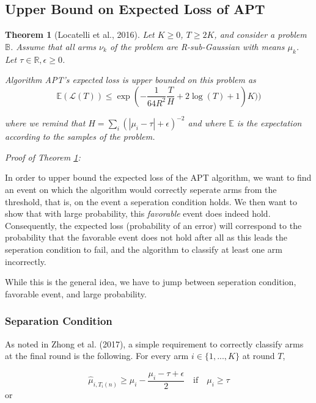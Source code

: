 \documentclass[12pt,]{article}
\newtheorem{theorem}{Theorem}
\begin{document}
\subsection{Upper Bound on Expected Loss of
APT}\label{upper-bound-on-expected-loss-of-apt}

\begin{theorem}[Locatelli et al., 2016] \label{theorem:LocatelliTheorem4}
Let $K \geq 0$, $T \geq 2K$, and consider a problem $\mathbb{B}$. Assume that
all arms $\nu_k$ of the problem are R-sub-Gaussian with means $\mu_k$. Let $\tau
\in \mathbb{R}, \epsilon \geq 0$.

Algorithm APT's expected loss is upper bounded on this problem as 
\begin{equation*} \mathbb{E}(\mathcal{L}(T)) \leq \exp
(-\frac{1}{64R^2}\frac{T}{H} + 2 \log (T) + 1)K)) \end{equation*}

where we remind that $H = \sum_i (|\mu_i - \tau | + \epsilon)^{-2}$ and where
$\mathbb{E}$ is the expectation according to the samples of the problem.
\end{theorem}

\emph{Proof of Theorem \ref{theorem:LocatelliTheorem4}:}

In order to upper bound the expected loss of the APT algorithm, we want
to find an event on which the algorithm would correctly seperate arms
from the threshold, that is, on the event a seperation condition holds.
We then want to show that with large probability, this \emph{favorable}
event does indeed hold. Consequently, the expected loss (probability of
an error) will correspond to the probability that the favorable event
does not hold after all as this leads the seperation condition to fail,
and the algorithm to classify at least one arm incorrectly.

While this is the general idea, we have to jump between seperation
condition, favorable event, and large probability.

\subsubsection{Separation Condition}\label{separation-condition}

As noted in Zhong et al. (2017), a simple requirement to correctly
classify arms at the final round is the following. For every arm
\(i \in \{1, ..., K\}\) at round \(T\),

\[
\hat{\mu}_{i,T_i(n)} \geq \mu_i - \frac{\mu_i - \tau + \epsilon}{2} \quad \text{if} \quad \mu_i \geq \tau
\] or
\end{document}
